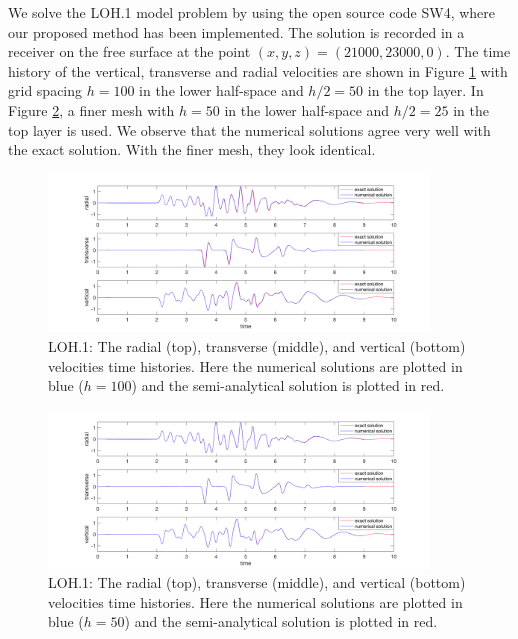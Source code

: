 We solve the LOH.1 model problem by using the open source code SW4, where our proposed method has been implemented. The solution is recorded in a receiver on the free surface at the point $(x, y, z) = (21000, 23000, 0)$. The time history of the vertical, transverse and radial velocities are shown in Figure \ref{loh1_100} with grid spacing $h = 100$ in the lower half-space and $h/2 = 50$ in the top layer. In Figure \ref{loh1_50}, a finer mesh with $h = 50$ in the lower half-space and $h/2 = 25$ in the top layer is used. We observe that the numerical solutions agree very well with the exact solution. With the finer mesh, they look identical.
\begin{figure}[htbp]
	\centering
	\includegraphics[width=0.9\textwidth,trim={2cm 0cm 2cm 0cm}, clip]{loh1_h100.png}
	\caption{LOH.1: The radial (top), transverse (middle), and vertical (bottom) velocities time histories. Here the numerical solutions are plotted in blue ($h = 100$) and the semi-analytical solution is plotted in red.}\label{loh1_100}
\end{figure}

\begin{figure}[htbp]
	\centering
	\includegraphics[width=0.9\textwidth,trim={2cm 0cm 2cm 0cm}, clip]{loh1_h50.png}
	\caption{LOH.1: The radial (top), transverse (middle), and vertical (bottom) velocities time histories. Here the numerical solutions are plotted in blue ($h = 50$) and the semi-analytical solution is plotted in red.}\label{loh1_50}
\end{figure}

